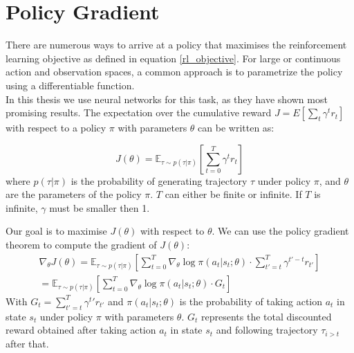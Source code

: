 \section{Policy Gradient}
There are numerous ways to arrive at a policy that maximises the reinforcement learning objective as defined in equation 
\ref{rl_objective}. For large or continuous action and observation spaces, a common approach is 
to parametrize the policy using a differentiable function.\\ 
In this thesis we use neural networks for this task, as they have shown most promising results. The expectation over the cumulative 
reward $J = E[\sum_{t} \gamma^t r_t]$ with respect to a policy $\pi$ with parameters $\theta$ can be written as:

\begin{equation}
J(\theta) = \mathbb{E}_{\tau \sim p(\tau | \pi)} \left[ \sum_{t=0}^T \gamma^t r_t \right]
\end{equation}
where  $p(\tau | \pi)$ is the probability of generating trajectory $\tau$ under policy $\pi$, and $\theta$ are the parameters of the policy $\pi$. 
$T$ can either be finite or infinite. If $T$ is infinite, $\gamma$ must be smaller then 1.

Our goal is to maximise $J(\theta)$ with respect to $\theta$. We can use the policy gradient theorem to compute the gradient of $J(\theta)$:
\begin{equation}
    \label{nabla_reinforce}
    \begin{aligned}
        \nabla_{\theta} J(\theta) = \mathbb{E}_{\tau \sim p(\tau | \pi)} \left[ \sum_{t=0}^T \nabla_{\theta} \log \pi(a_t|s_t;\theta) \cdot \sum_{t'=t}^T \gamma^{t'-t} r_{t'} \right]\\
        = \mathbb{E}_{\tau \sim p(\tau | \pi)} \left[ \sum_{t=0}^T \nabla_{\theta} \log \pi(a_t|s_t;\theta) \cdot  G_t\right]
    \end{aligned}
\end{equation}
With $G_t = \sum_{t'=t}^T \gamma^t' r_{t'}$ and $\pi(a_t|s_t;\theta)$ is the probability of taking action $a_t$ in state $s_t$ under policy $\pi$ with parameters $\theta$. 
$G_t$ represents the total discounted reward obtained after taking action $a_t$ in state $s_t$ and following trajectory $\tau_{i>t}$ after that.

